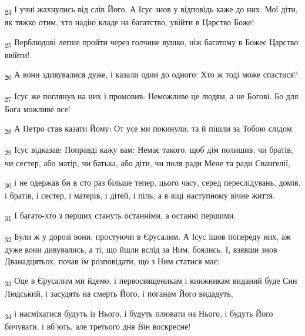 \begin{tcolorbox}
\textsubscript{24} І учні жахнулись від слів Його. А Ісус знов у відповідь каже до них: Мої діти, як тяжко отим, хто надію кладе на багатство, увійти в Царство Боже!
\end{tcolorbox}
\begin{tcolorbox}
\textsubscript{25} Верблюдові легше пройти через голчине вушко, ніж багатому в Божеє Царство ввійти!
\end{tcolorbox}
\begin{tcolorbox}
\textsubscript{26} А вони здивувалися дуже, і казали один до одного: Хто ж тоді може спастися?
\end{tcolorbox}
\begin{tcolorbox}
\textsubscript{27} Ісус же поглянув на них і промовив: Неможливе це людям, а не Богові. Бо для Бога можливе все!
\end{tcolorbox}
\begin{tcolorbox}
\textsubscript{28} А Петро став казати Йому: От усе ми покинули, та й пішли за Тобою слідом.
\end{tcolorbox}
\begin{tcolorbox}
\textsubscript{29} Ісус відказав: Поправді кажу вам: Немає такого, щоб дім полишив, чи братів, чи сестер, або матір, чи батька, або діти, чи поля ради Мене та ради Євангелії,
\end{tcolorbox}
\begin{tcolorbox}
\textsubscript{30} і не одержав би в сто раз більше тепер, цього часу, серед переслідувань, домів, і братів, і сестер, і матерів, і дітей, і піль, а в віці наступному вічне життя.
\end{tcolorbox}
\begin{tcolorbox}
\textsubscript{31} І багато-хто з перших стануть останніми, а останні першими.
\end{tcolorbox}
\begin{tcolorbox}
\textsubscript{32} Були ж у дорозі вони, простуючи в Єрусалим. А Ісус ішов попереду них, аж дуже вони дивувались, а ті, що йшли вслід за Ним, боялись. І, взявши знов Дванадцятьох, почав їм розповідати, що з Ним статися має:
\end{tcolorbox}
\begin{tcolorbox}
\textsubscript{33} Оце в Єрусалим ми йдемо, і первосвященикам і книжникам виданий буде Син Людський, і засудять на смерть Його, і поганам Його видадуть,
\end{tcolorbox}
\begin{tcolorbox}
\textsubscript{34} і насміхатися будуть із Нього, і будуть плювати на Нього, і будуть Його бичувати, і вб'ють, але третього дня Він воскресне!
\end{tcolorbox}
